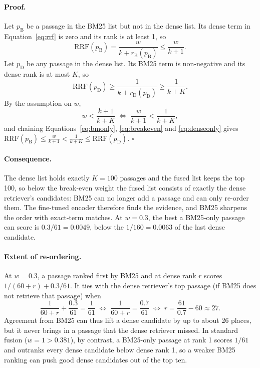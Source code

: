 \paragraph{Proof.} Let $p_{\mathrm{B}}$ be a passage in the BM25 list but not in the dense list.
Its dense term in Equation~\eqref{eq:rrf} is zero and its rank is at least 1, so
\begin{equation}
\mathrm{RRF}(p_{\mathrm{B}}) = \frac{w}{k + r_{\mathrm{B}}(p_{\mathrm{B}})} \le \frac{w}{k + 1}.
\label{eq:bmonly}
\end{equation}
Let $p_{\mathrm{D}}$ be any passage in the dense list. Its BM25 term is non-negative and its
dense rank is at most $K$, so
\begin{equation}
\mathrm{RRF}(p_{\mathrm{D}}) \ge \frac{1}{k + r_{\mathrm{D}}(p_{\mathrm{D}})} \ge \frac{1}{k + K}.
\label{eq:denseonly}
\end{equation}
By the assumption on $w$,
\begin{equation}
w < \frac{k+1}{k+K}
\;\Longleftrightarrow\;
\frac{w}{k+1} < \frac{1}{k+K},
\label{eq:breakeven}
\end{equation}
and chaining Equations~\eqref{eq:bmonly}, \eqref{eq:breakeven} and \eqref{eq:denseonly} gives
$\mathrm{RRF}(p_{\mathrm{B}}) \le \frac{w}{k+1} < \frac{1}{k+K} \le \mathrm{RRF}(p_{\mathrm{D}})$.
\hfill$\square$

\paragraph{Consequence.} The dense list holds exactly $K = 100$ passages and the fused list keeps
the top 100, so below the break-even weight the fused list consists of exactly the dense
retriever's candidates: BM25 can no longer add a passage and can only re-order them. The
fine-tuned encoder therefore finds the evidence, and BM25 sharpens the order with exact-term
matches. At $w = 0.3$, the best a BM25-only passage can score is $0.3/61 = 0.0049$, below the
$1/160 = 0.0063$ of the last dense candidate.

\paragraph{Extent of re-ordering.} At $w = 0.3$, a passage ranked first by BM25 and at dense rank
$r$ scores $1/(60 + r) + 0.3/61$. It ties with the dense retriever's top passage (if BM25 does
not retrieve that passage) when
\begin{equation}
\frac{1}{60 + r} + \frac{0.3}{61} = \frac{1}{61}
\;\Longleftrightarrow\;
\frac{1}{60 + r} = \frac{0.7}{61}
\;\Longleftrightarrow\;
r = \frac{61}{0.7} - 60 \approx 27.
\label{eq:lift}
\end{equation}
Agreement from BM25 can thus lift a dense candidate by up to about 26 places, but it never
brings in a passage that the dense retriever missed. In standard fusion ($w = 1 > 0.381$), by
contrast, a BM25-only passage at rank 1 scores $1/61$ and outranks every dense candidate below
dense rank 1, so a weaker BM25 ranking can push good dense candidates out of the top ten.

